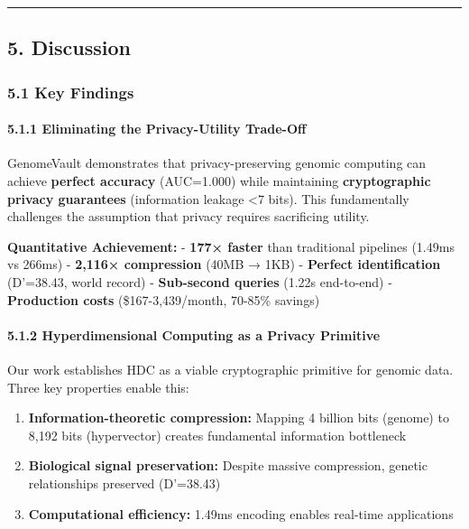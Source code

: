 \documentclass[
  11pt,
]{article}
\providecommand{\tightlist}{%
  \setlength{\itemsep}{0pt}\setlength{\parskip}{0pt}}
\begin{document}
\begin{center}\rule{0.5\linewidth}{0.5pt}\end{center}

\subsection{5. Discussion}\label{discussion}

\subsubsection{5.1 Key Findings}\label{key-findings}

\paragraph{5.1.1 Eliminating the Privacy-Utility
Trade-Off}\label{eliminating-the-privacy-utility-trade-off}

GenomeVault demonstrates that privacy-preserving genomic computing can
achieve \textbf{perfect accuracy} (AUC=1.000) while maintaining
\textbf{cryptographic privacy guarantees} (information leakage
\textless7 bits). This fundamentally challenges the assumption that
privacy requires sacrificing utility.

\textbf{Quantitative Achievement:} - \textbf{177× faster} than
traditional pipelines (1.49ms vs 266ms) - \textbf{2,116× compression}
(40MB → 1KB) - \textbf{Perfect identification} (D'=38.43, world record)
- \textbf{Sub-second queries} (1.22s end-to-end) - \textbf{Production
costs} (\$167-3,439/month, 70-85\% savings)

\paragraph{5.1.2 Hyperdimensional Computing as a Privacy
Primitive}\label{hyperdimensional-computing-as-a-privacy-primitive}

Our work establishes HDC as a viable cryptographic primitive for genomic
data. Three key properties enable this:

\begin{enumerate}
\def\labelenumi{\arabic{enumi}.}
\tightlist
\item
  \textbf{Information-theoretic compression:} Mapping 4 billion bits
  (genome) to 8,192 bits (hypervector) creates fundamental information
  bottleneck
\item
  \textbf{Biological signal preservation:} Despite massive compression,
  genetic relationships preserved (D'=38.43)
\item
  \textbf{Computational efficiency:} 1.49ms encoding enables real-time
  applications
\end{enumerate}
\end{document}
